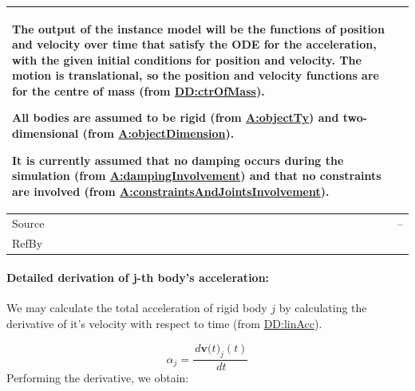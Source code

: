 \documentclass[12pt]{article}
\begin{document}
\begin{minipage}{\textwidth}
\begin{tabular}{>{\raggedright}p{}>{\raggedright\arraybackslash}p{}}
        The output of the instance model will be the functions of position and velocity over time that satisfy the ODE for the acceleration, with the given initial conditions for position and velocity. The motion is translational, so the position and velocity functions are for the centre of mass (from \hyperref[DD:ctrOfMass]{DD:ctrOfMass}).
        
        All bodies are assumed to be rigid (from \hyperref[assumpOT]{A:objectTy}) and two-dimensional (from \hyperref[assumpOD]{A:objectDimension}).
        
        It is currently assumed that no damping occurs during the simulation (from \hyperref[assumpDI]{A:dampingInvolvement}) and that no constraints are involved (from \hyperref[assumpCAJI]{A:constraintsAndJointsInvolvement}).
        
\\ \midrule
Source & --
         
\\ \midrule
RefBy & 
\\ \bottomrule
\end{tabular}
\end{minipage}
\paragraph{Detailed derivation of j-th body's acceleration:}
\label{IM:transMotDeriv}
We may calculate the total acceleration of rigid body $j$ by calculating the derivative of it's velocity with respect to time (from \hyperref[DD:linAcc]{DD:linAcc}).

\begin{displaymath}
{α_{j}}=\frac{\,d{\symbf{v}\text{(}t\text{)}_{j}}\left(t\right)}{\,dt}
\end{displaymath}
Performing the derivative, we obtain:
\end{document}
